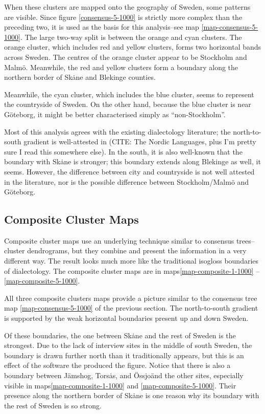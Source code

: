 When these clusters are mapped onto the geography of Sweden, some
patterns are visible. Since figure \ref{consensus-5-1000} is strictly
more complex than the preceding two, it is used as the basis for this
analysis--see map \ref{map-consensus-5-1000}. The large two-way split
is between the orange and cyan clusters. The orange cluster, which
includes red and yellow clusters, forms two horizontal bands across
Sweden. The centres of the orange cluster appear to be Stockholm and
Malm\"o. Meanwhile, the red and yellow clusters form a boundary along
the northern border of Sk\.ane and Blekinge counties.

Meanwhile, the cyan cluster, which includes the blue cluster, seems to
represent the countryside of Sweden. On the other hand, because the
blue cluster is near G\"oteborg, it might be better characterised
simply as ``non-Stockholm''.

Most of this analysis agrees with the existing dialectology
literature; the north-to-south gradient is well-attested in (CITE: The
Nordic Languages, plus I'm pretty sure I read this somewhere
else). In the south, it is also well-known that the boundary with
Sk\.ane is stronger; this boundary extends along Blekinge as well, it
seems. However, the difference between city and countryside is not
well attested in the literature, nor is the possible difference
between Stockholm/Malm\"o and G\"oteborg.

\subsection{Composite Cluster Maps}

Composite cluster maps use an underlying technique similar to consensus
trees--cluster dendrograms, but they combine and present the information in
a very different way. The result looks much more like the traditional
isogloss boundaries of dialectology. The composite cluster maps are in
maps\ref{map-composite-1-1000} -- \ref{map-composite-5-1000}.

All three composite clusters maps provide a picture similar to the
consensus tree map \ref{map-consensus-5-1000} of the previous
section. The north-to-south gradient is supported by the
weak horizontal boundaries present up and down Sweden.

Of these boundaries, the one between Sk\.ane and the rest of Sweden is
the strongest. Due to the lack of interview sites in the middle of
south Sweden, the boundary is drawn further north than it
traditionally appears, but this is an effect of the software the
produced the figure. Notice that there is also a boundary between
J\"amshog, Tors\.as, and \"Ossjo\" and the other sites, especially
visible in maps\ref{map-composite-1-1000} and
\ref{map-composite-5-1000}. Their presence along the northern border
of Sk\.ane is one reason why its boundary with the rest of Sweden is
so strong.

